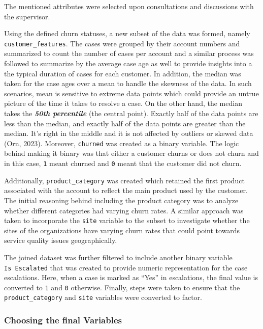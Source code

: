 \documentclass[
]{article}
\begin{document}
The mentioned attributes were selected upon consultations and discussions with the supervisor.

Using the defined churn statuses, a new subset of the data was formed, namely \texttt{customer\_features}. The cases were grouped by their account numbers and summarized to count the number of cases per account and a similar process was followed to summarize by the average case age as well to provide insights into a the typical duration of cases for each customer. In addition, the median was taken for the case ages over a mean to handle the skewness of the data. In such scenarios, mean is sensitive to extreme data points which could provide an untrue picture of the time it takes to resolve a case. On the other hand, the median takes the \textbf{\emph{50th percentile}} (the central point). Exactly half of the data points are less than the median, and exactly half of the data points are greater than the median. It's right in the middle and it is not affected by outliers or skewed data (Orn, 2023). Moreover, \texttt{churned} was created as a binary variable. The logic behind making it binary was that either a customer churns or does not churn and in this case, \texttt{1} meant churned and \texttt{0} meant that the customer did not churn.

Additionally, \texttt{product\_category} was created which retained the first product associated with the account to reflect the main product used by the customer. The initial reasoning behind including the product category was to analyze whether different categories had varying churn rates. A similar approach was taken to incorporate the \texttt{site} variable to the subset to investigate whether the sites of the organizations have varying churn rates that could point towards service quality issues geographically.

The joined dataset was further filtered to include another binary variable \texttt{Is\ Escalated} that was created to provide numeric representation for the case escalations. Here, when a case is marked as ``Yes'' in escalations, the final value is converted to \texttt{1} and \texttt{0} otherwise. Finally, steps were taken to ensure that the \texttt{product\_category} and \texttt{site} variables were converted to factor.

\subsubsection{Choosing the final Variables}\label{choosing-the-final-variables}
\end{document}
